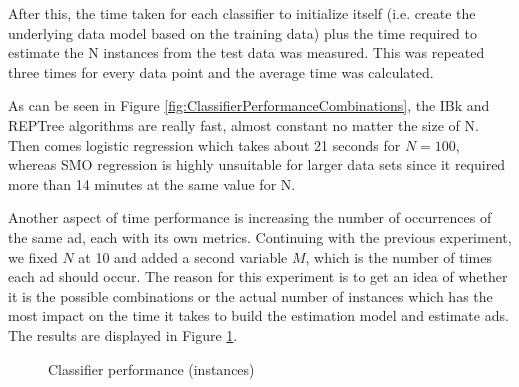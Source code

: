 \documentclass{sig-alternate}
\begin{document}
After this, the time taken for each classifier to initialize itself (i.e. create the underlying data model based on the training data) plus the time required to estimate the N instances from the test data was measured. This was repeated three times for every data point and the average time was calculated.

As can be seen in Figure \ref{fig:ClassifierPerformanceCombinations}, the IBk and REPTree algorithms are really fast, almost constant no matter the size of N. Then comes logistic regression which takes about 21 seconds for \(N = 100\), whereas SMO regression is highly unsuitable for larger data sets since it required more than 14 minutes at the same value for N.

Another aspect of time performance is increasing the number of occurrences of the same ad, each with its own metrics. Continuing with the previous experiment, we fixed \(N\) at 10 and added a second variable \(M\), which is the number of times each ad should occur. The reason for this experiment is to get an idea of whether it is the possible combinations or the actual number of instances which has the most impact on the time it takes to build the estimation model and estimate ads. The results are displayed in Figure \ref{fig:ClassifierPerformanceInstances}.

\begin{figure}[htb]
\begin{center}

    \caption{Classifier performance (instances)}
    \label{fig:ClassifierPerformanceInstances}
\end{center}
\end{figure}
\end{document}
